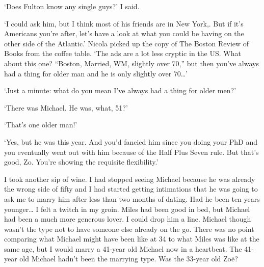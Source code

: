 `Does Fulton know any single guys?' I said.

`I could ask him, but I think most of his friends are in New York,. But if it's Americans you're after, let's have a look at what you could be having on the other side of the Atlantic.' Nicola picked up
the copy of {\twelvesl The Boston Review of Books\/} from the coffee
table. `The ads are a lot less cryptic in the US. What
about this one? ``Boston, Married, WM, slightly over 70,'' but then
you've always had a thing for older man and he is only {\twelveit
slightly\/} over 70{\dots}'

`Just a minute: what do you mean I've always had a thing for older men?'

`There was Michael. He was, what, 51?'

`That's {\twelveit one\/} older man!'

`Yes, but he was {\twelveit this\/} year. And you'd fancied him since you doing your PhD and you eventually went out with him because of the Half Plus Seven rule. But that's good, Zo. You're showing the requisite flexibility.'

I took another sip of wine. I had stopped seeing Michael because he was already the wrong side of fifty and I had started getting intimations that he was going to ask me to marry him after less than two months of dating. Had he been ten years younger{\dots} I felt a twitch in my groin. Miles had been good in bed, but Michael had been a much more generous lover. I could drop him a line. Michael though wasn't the type not to have someone else already on the go. There was no point comparing what Michael might have been like at 34 to what Miles was like at the same age, but I would marry a 41-year old Michael now in a heartbeat. The 41-year old Michael hadn't been the marrying type. Was the 33-year old Zo{\"e}?

